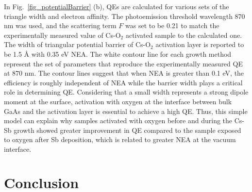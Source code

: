 In Fig.~\ref{fig_potentialBarrier} (b), QEs are calculated for various sets of the triangle width and electron affinity. The photoemission threshold wavelength 870 nm was used, and the scattering term $F$ was set to be 0.21 to match the experimentally measured value of Cs-O$_2$ activated sample to the calculated one. The width of triangular potential barrier of Cs-O$_2$ activation layer is reported to be 1.5 \AA\cite{vergara1999} with 0.35 eV NEA.\cite{jin2014, bakin2015,uebbing1970} The white contour line for each growth method represent the set of parameters that reproduce the experimentally measured QE at 870 nm.
The contour lines suggest that when NEA is greater than 0.1 eV, the efficiency is roughly independent of NEA while the barrier width plays a critical role in determining QE. Considering that a small width represents a strong dipole moment at the surface, activation with oxygen at the interface between bulk GaAs and the activation layer is essential to achieve a high QE.
Thus, this simple model can explain why samples activated with oxygen before and during the Cs-Sb growth showed greater improvement in QE compared to the sample exposed to oxygen after Sb deposition, which is related to greater NEA at the vacuum interface.


\section{Conclusion}


